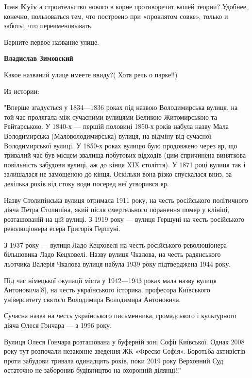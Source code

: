 \begin{itemize}
\begin{itemize}
\begin{itemize}
\textbf{Ines Kyiv} а строительство нового в корне противоречит вашей теории? Удобнее, конечно, пользоваться тем, что построено при «проклятом совке», только и заботы, что переименовывать.
\end{itemize} %

\end{itemize} %

Верните первое название улице.

\begin{itemize} %
\textbf{Владислав Зимовский} 

Какое названий улице имеете ввиду?( Хотя речь о парке!!)

Из истории:

"Вперше згадується у 1834—1836 роках під назвою Володимирська вулиця, на той
час пролягала між сучасними вулицями Великою Житомирською та Рейтарською. У
1840-х — першій половині 1850-х років набула назву Мала Володимирська
(Маловолодимирська) вулиця, на відміну від сучасної Володимирської вулиці. У
1850-х роках вулицю було продовжено через яр, що тривалий час був місцем
звалища побутових відходів (цим спричинена виняткова повільність забудови
вулиці, аж до кінця XIX століття). У 1871 році вулиця так і залишалася не
замощеною до кінця. Оскільки вона різко спускалася вниз, за декілька років від
стоку води посеред неї утворився яр.

Назву Столипінська вулиця отримала 1911 року, на честь російського політичного
діяча Петра Столипіна, який після смертельного поранення помер у клініці,
розташованій на цій вулиці. З 1919 року — вулиця Гершуні на честь російського
революціонера есера Григорія Гершуні.

З 1937 року — вулиця Ладо Кецховелі на честь російського революціонера
більшовика Ладо Кецховелі. Назву вулиця Чкалова, на честь радянського льотчика
Валерія Чкалова вулиця набула 1939 року підтверджена 1944 року.

Під час німецької окупації міста у 1942—1943 роках мала назву вулиця
Антоновича[8], на честь українського історика, професора Київського
університету святого Володимира Володимира Антоновича.

Сучасна назва на честь українського письменника, громадського і культурного
діяча Олеся Гончара — з 1996 року.

Вулиця Олеся Гончара розташована у буферній зоні Софії Київської. Однак 2008
року тут розпочали незаконне зведення ЖК «Фреско Софія». Боротьба активістів
проти забудови тривала одинадцять років, поки 2019 року Верховний Суд остаточно
не заборонив будівництво на охоронній ділянці!!"


\end{itemize}
\end{itemize}
